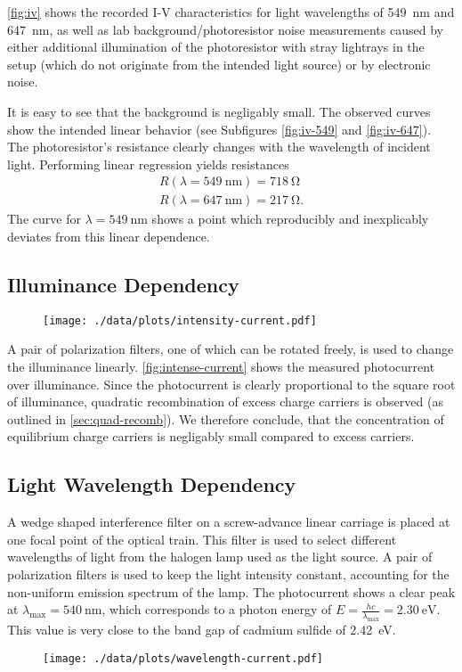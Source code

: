 \autoref{fig:iv} shows the recorded I-V characteristics for light wavelengths of \SI{549}{\nm} and \SI{647}{\nm}, as well as lab background/photoresistor noise measurements caused by either additional illumination of the photoresistor with stray lightrays in the setup (which do not originate from the intended light source) or by electronic noise.

It is easy to see that the background is negligably small.
The observed curves show the intended linear behavior (see Subfigures \ref{fig:iv-549} and \ref{fig:iv-647}).
The photoresistor's resistance clearly changes with the wavelength of incident light.
Performing linear regression yields resistances
\begin{align*}
  R(\lambda = \SI{549}{\nm}) = \SI{718}{\ohm} \\
  R(\lambda = \SI{647}{\nm}) = \SI{217}{\ohm}.
\end{align*}
The curve for $\lambda=\SI{549}{\nm}$ shows a point which reproducibly and inexplicably deviates from this linear dependence.

\subsection{Illuminance Dependency}
\begin{figure}
	\centering
	\texttt{[image: ./data/plots/intensity-current.pdf]}
	\label{fig:intense-current}
\end{figure}
A pair of polarization filters, one of which can be rotated freely, is used to change the illuminance linearly.
\autoref{fig:intense-current} shows the measured photocurrent over illuminance.
Since the photocurrent is clearly proportional to the square root of illuminance, quadratic recombination of excess charge carriers is observed (as outlined in \autoref{sec:quad-recomb}).
We therefore conclude, that the concentration of equilibrium charge carriers is negligably small compared to excess carriers.

\subsection{Light Wavelength Dependency}
A wedge shaped interference filter on a screw-advance linear carriage is placed at one focal point of the optical train.
This filter is used to select different wavelengths of light from the halogen lamp used as the light source.
A pair of polarization filters is used to keep the light intensity constant, accounting for the non-uniform emission spectrum of the lamp.
The photocurrent shows a clear peak at $\lambda_\text{max} = \SI{540}{\nano\meter}$, which corresponds to a photon energy of $E = \frac{h c}{\lambda_\text{max}} = \SI{2.30}{\electronvolt}$.
This value is very close to the band gap of cadmium sulfide of \SI{2.42}{\electronvolt}.
\begin{figure}
	\centering
	\texttt{[image: ./data/plots/wavelength-current.pdf]}
	\label{fig:freq-current}
\end{figure}

